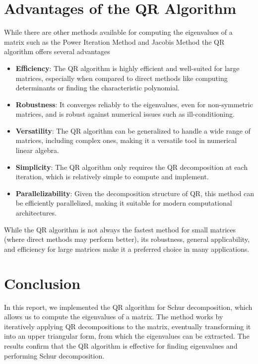 \documentclass[journal]{IEEEtran}
\begin{document}
\section{Advantages of the QR Algorithm}
While there are other methods available for computing the eigenvalues of a matrix such as the Power Iteration Method and Jacobis Method the QR algorithm offers several advantages
\begin{itemize}
    \item \textbf{Efficiency}: The QR algorithm is highly efficient and well-suited for large matrices, especially when compared to direct methods like computing determinants or finding the characteristic polynomial.
    \item \textbf{Robustness}: It converges reliably to the eigenvalues, even for non-symmetric matrices, and is robust against numerical issues such as ill-conditioning.
    \item \textbf{Versatility}: The QR algorithm can be generalized to handle a wide range of matrices, including complex ones, making it a versatile tool in numerical linear algebra.
    \item \textbf{Simplicity}: The QR algorithm only requires the QR decomposition at each iteration, which is relatively simple to compute and implement.
    \item \textbf{Parallelizability}: Given the decomposition structure of QR, this method can be efficiently parallelized, making it suitable for modern computational architectures.
\end{itemize}

While the QR algorithm is not always the fastest method for small matrices (where direct methods may perform better), its robustness, general applicability, and efficiency for large matrices make it a preferred choice in many applications.

\section{Conclusion}
In this report, we implemented the QR algorithm for Schur decomposition, which allows us to compute the eigenvalues of a matrix. The method works by iteratively applying QR decompositions to the matrix, eventually transforming it into an upper triangular form, from which the eigenvalues can be extracted. The results confirm that the QR algorithm is effective for finding eigenvalues and performing Schur decomposition.
\end{document}
